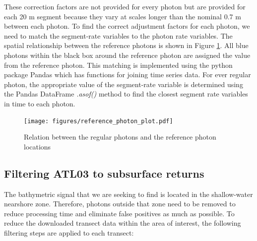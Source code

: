 These correction factors are not provided for every photon but are provided for each 20 m segment because they vary at scales longer than the nominal 0.7 m between each photon. To find the correct adjustment factors for each photon, we need to match the segment-rate variables to the photon rate variables. The spatial relationship between the reference photons is shown in Figure \ref{fig:reference-photon_match}. All blue photons within the black box around the reference photon are assigned the value from the reference photon. This matching is implemented using the python package Pandas \parencite{jeff_reback_2022_6408044,mckinney-proc-scipy-2010} which has functions for joining time series data. For ever regular photon, the appropriate value of the segment-rate variable is determined using the Pandas DataFrame \emph{.asof()} method to find the closest segment rate variables in time to each photon. 

\begin{figure}[h]
    \centering
    \texttt{[image: figures/reference\_photon\_plot.pdf]}
    \caption{Relation between the regular photons and the reference photon locations}
    \label{fig:reference-photon_match} 
\end{figure}

\subsection{Filtering ATL03 to subsurface returns}\label{subsec:subsurface-filtering}

The bathymetric signal that we are seeking to find is located in the shallow-water nearshore zone. Therefore, photons outside that zone need to be removed to reduce processing time and eliminate false positives as much as possible. To reduce the downloaded transect data within the area of interest, the following filtering steps are applied to each transect:

